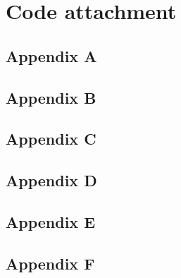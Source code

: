 \documentclass{scrartcl}
\begin{document}
\section*{Code attachment}
\subsection*{Appendix A}

\subsection*{Appendix B}

\subsection*{Appendix C}

\subsection*{Appendix D}

\subsection*{Appendix E}

\subsection*{Appendix F}

\end{document}

